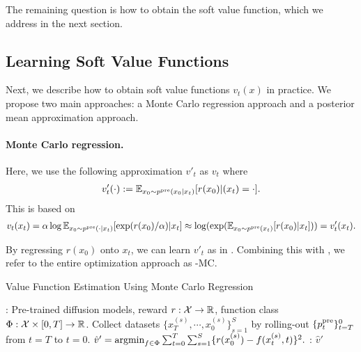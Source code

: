 The remaining question is how to obtain the soft value function, which we address in the next section.

\vspace{-2mm}
\subsection{Learning Soft Value Functions}\label{sec:soft}
\vspace{-2mm}

Next, we describe how to obtain soft value functions $v_t(x)$ in practice. We propose two main approaches: a Monte Carlo regression approach and a posterior mean approximation approach.

\vspace{-2mm}
\paragraph{Monte Carlo regression.}

Here, we use the following approximation $v'_t$ as $v_t$ where 
\begin{align*}
    v'_t(\cdot ):= \mathbb{E}_{x_0\sim p^{\mathrm{pre}}(x_0|x_t)}[ r(x_0) | (x_t)=\cdot ]. 
\end{align*}
This is based on 
\begin{align}\label{eq:approximation}
   v_t(x_t)= \alpha \log \mathbb{E}_{x_0\sim p^{\mathrm{pre}}(\cdot|x_t)}[\exp(r(x_0)/{\alpha}) |x_t]\approx \log (\exp(\mathbb{E}_{x_0\sim p^{\mathrm{pre}}(x_t)}[r(x_0)|x_t])) = v'_t(x_t). 
\end{align}

By regressing $r(x_0)$ onto $x_t$, we can learn $v'_t$ as in . Combining this with , we refer to the entire optimization approach as \alg-MC. 

\begin{algorithm}[!th]
\caption{Value Function Estimation Using Monte Carlo Regression}\label{alg:MC}
\begin{algorithmic}[1]
     :  Pre-trained diffusion models, reward $r:\mathcal{X} \to \mathbb{R}$, function class $\Phi: \mathcal{X}  \times [0,T]\to \mathbb{R}$.
    \STATE Collect datasets $\{x^{(s)}_{T},\cdots,x^{(s)}_0\}_{s=1}^S$ by rolling-out $\{ p^{\mathrm{pre}}_t\}_{t=T}^0$ from $t=T$ to $t=0$. 
    \STATE $
        \hat v' = \mathop{\mathrm{argmin}}_{f \in \Phi}\sum_{t=0}^{T} \sum_{s=1}^S \{r(x^{(s)}_0) - f(x^{(s)}_t, t) \}^2.  $
      : $ \hat v'$
\end{algorithmic}
\end{algorithm}

